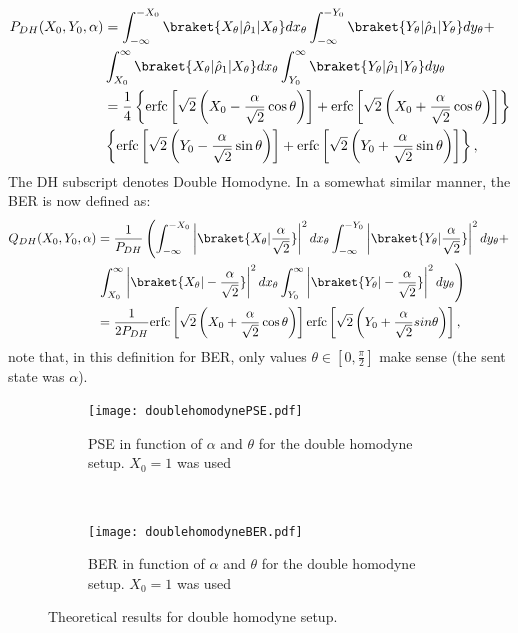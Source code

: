 \begin{equation}
\begin{aligned}
P_{DH}(X_0,Y_0,\alpha)&=\int^{-X_0}_{-\infty}\braket{X_\theta|\hat{\rho}_1|X_\theta}dx_\theta\int^{-Y_0}_{-\infty}\braket{Y_\theta|\hat{\rho}_1|Y_\theta}dy_\theta+\\
&\int_{X_0}^{\infty}\braket{X_\theta|\hat{\rho}_1|X_\theta}dx_\theta\int_{Y_0}^{\infty}\braket{Y_\theta|\hat{\rho}_1|Y_\theta}dy_\theta\\
&=\frac{1}{4}\left\lbrace\text{erfc}\left[\sqrt{2}\left(X_0-\frac{\alpha}{\sqrt{2}}\cos\theta\right)\right]+\text{erfc}\left[\sqrt{2}\left(X_0+\frac{\alpha}{\sqrt{2}}\cos\theta\right)\right]\right\rbrace\\
&\left\lbrace\text{erfc}\left[\sqrt{2}\left(Y_0-\frac{\alpha}{\sqrt{2}}\sin\theta\right)\right]+\text{erfc}\left[\sqrt{2}\left(Y_0+\frac{\alpha}{\sqrt{2}}\sin\theta\right)\right]\right\rbrace,
\end{aligned}
\end{equation}
The DH subscript denotes Double Homodyne. In a somewhat similar manner, the BER is now defined as:
\begin{equation}\label{eq:adaptedBER}
\begin{aligned}
Q_{DH}(X_0,Y_0,\alpha)&=\frac{1}{P_{DH}}\left(\int^{-X_0}_{-\infty}\left|\braket{X_\theta|\frac{\alpha}{\sqrt{2}}}\right|^2dx_\theta\int^{-Y_0}_{-\infty}\left|\braket{Y_\theta|\frac{\alpha}{\sqrt{2}}}\right|^2dy_\theta+\right.\\
&\left.\int_{X_0}^{\infty}\left|\braket{X_\theta|-\frac{\alpha}{\sqrt{2}}}\right|^2dx_\theta\int_{Y_0}^{\infty}\left|\braket{Y_\theta|-\frac{\alpha}{\sqrt{2}}}\right|^2dy_\theta\right)\\
&=\frac{1}{2P_{DH}}\text{erfc}\left[\sqrt{2}\left(X_0+\frac{\alpha}{\sqrt{2}}\cos\theta\right)\right]\text{erfc}\left[\sqrt{2}\left(Y_0+\frac{\alpha}{\sqrt{2}}sin\theta\right)\right],
\end{aligned}
\end{equation}
note that, in this definition for BER, only values $\theta\in\left[0,\frac{\pi}{2}\right]$ make sense (the sent state was $\alpha$).

\begin{figure}[h]
\centering
\begin{subfigure}{.48\linewidth}
\texttt{[image: doublehomodynePSE.pdf]}
\caption{PSE in function of $\alpha$ and $\theta$ for the double homodyne setup. $X_0=1$ was used}
\end{subfigure}
~
\begin{subfigure}{.48\linewidth}
\texttt{[image: doublehomodyneBER.pdf]}
\caption{BER in function of $\alpha$ and $\theta$ for the double homodyne setup. $X_0=1$ was used}
\end{subfigure}
\caption{Theoretical results for double homodyne setup.}
\end{figure}

